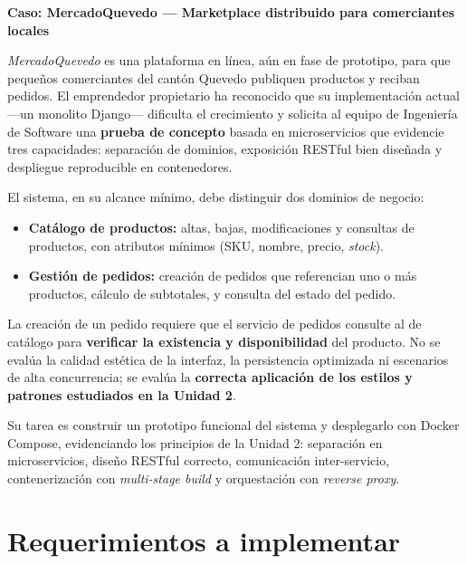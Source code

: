 \documentclass[11pt,a4paper]{article}
\begin{document}
\begin{scenariobox}
\textbf{Caso: MercadoQuevedo --- Marketplace distribuido para comerciantes locales}

\medskip

\emph{MercadoQuevedo} es una plataforma en línea, aún en fase de prototipo, para que pequeños comerciantes del cantón Quevedo publiquen productos y reciban pedidos. El emprendedor propietario ha reconocido que su implementación actual —un monolito Django— dificulta el crecimiento y solicita al equipo de Ingeniería de Software una \textbf{prueba de concepto} basada en microservicios que evidencie tres capacidades: separación de dominios, exposición RESTful bien diseñada y despliegue reproducible en contenedores.

\medskip

El sistema, en su alcance mínimo, debe distinguir dos dominios de negocio:

\begin{itemize}[leftmargin=1.2em, itemsep=0.2em]
    \item \textbf{Catálogo de productos:} altas, bajas, modificaciones y consultas de productos, con atributos mínimos (SKU, nombre, precio, \emph{stock}).
    \item \textbf{Gestión de pedidos:} creación de pedidos que referencian uno o más productos, cálculo de subtotales, y consulta del estado del pedido.
\end{itemize}

\medskip

La creación de un pedido requiere que el servicio de pedidos consulte al de catálogo para \textbf{verificar la existencia y disponibilidad} del producto. No se evalúa la calidad estética de la interfaz, la persistencia optimizada ni escenarios de alta concurrencia; se evalúa la \textbf{correcta aplicación de los estilos y patrones estudiados en la Unidad 2}.
\end{scenariobox}

Su tarea es construir un prototipo funcional del sistema y desplegarlo con Docker Compose, evidenciando los principios de la Unidad 2: separación en microservicios, diseño RESTful correcto, comunicación inter-servicio, contenerización con \emph{multi-stage build} y orquestación con \emph{reverse proxy}.

\section{Requerimientos a implementar}
\end{document}

